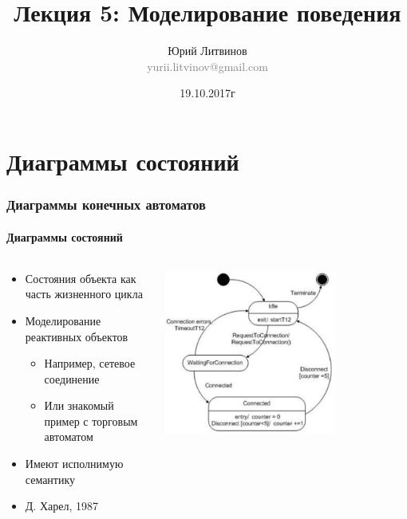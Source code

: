\documentclass[xetex,mathserif,serif]{beamer}
\title[Моделирование поведения]{Лекция 5: Моделирование поведения}
\author[Юрий Литвинов]{Юрий Литвинов\\\small{\textcolor{gray}{yurii.litvinov@gmail.com}}}
\date{19.10.2017г}
\begin{document}
	\frame{\titlepage}

	\section{Диаграммы состояний}

	\begin{frame}
		\frametitle{Диаграммы конечных автоматов}
		\framesubtitle{Диаграммы состояний}
		\begin{columns}
			\begin{column}{0.5\textwidth}
				\begin{itemize}
					\item Состояния объекта как часть жизненного цикла
					\item Моделирование реактивных объектов
					\begin{itemize}
						\item Например, сетевое соединение
						\item Или знакомый пример с торговым автоматом
					\end{itemize}
					\item Имеют исполнимую семантику
					\item Д. Харел, 1987
				\end{itemize}
			\end{column}
			\begin{column}{0.5\textwidth}
				\begin{center}
					\includegraphics[width=0.7\textwidth]{stateTransitionExample.png}
				\end{center}
			\end{column}
		\end{columns}
	\end{frame}
\end{document}

